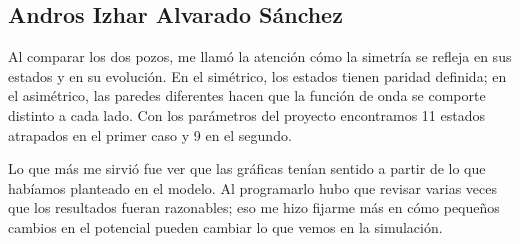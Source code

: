 

\subsection{Andros Izhar Alvarado Sánchez}

Al comparar los dos pozos, me llamó la atención cómo la simetría se refleja en sus estados y en su evolución. En el simétrico, los estados tienen paridad definida; en el asimétrico, las paredes diferentes hacen que la función de onda se comporte distinto a cada lado. Con los parámetros del proyecto encontramos 11 estados atrapados en el primer caso y 9 en el segundo.

Lo que más me sirvió fue ver que las gráficas tenían sentido a partir de lo que habíamos planteado en el modelo. Al programarlo hubo que revisar varias veces que los resultados fueran razonables; eso me hizo fijarme más en cómo pequeños cambios en el potencial pueden cambiar lo que vemos en la simulación.

